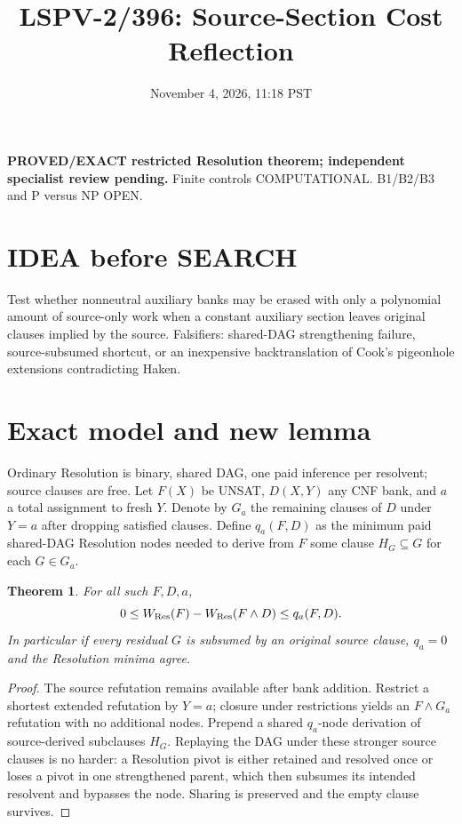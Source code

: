 \documentclass{article}
\title{LSPV-2/396: Source-Section Cost Reflection}
\date{November 4, 2026, 11:18 PST}
\newtheorem{theorem}{Theorem}
\begin{document}
\maketitle
\noindent\textbf{PROVED/EXACT restricted Resolution theorem; independent specialist review pending.} Finite controls COMPUTATIONAL. B1/B2/B3 and P versus NP OPEN.
\section*{IDEA before SEARCH}
Test whether nonneutral auxiliary banks may be erased with only a polynomial amount of source-only work when a constant auxiliary section leaves original clauses implied by the source. Falsifiers: shared-DAG strengthening failure, source-subsumed shortcut, or an inexpensive backtranslation of Cook's pigeonhole extensions contradicting Haken.
\section*{Exact model and new lemma}
Ordinary Resolution is binary, shared DAG, one paid inference per resolvent; source clauses are free. Let $F(X)$ be UNSAT, $D(X,Y)$ any CNF bank, and $a$ a total assignment to fresh $Y$. Denote by $G_a$ the remaining clauses of $D$ under $Y=a$ after dropping satisfied clauses. Define $q_a(F,D)$ as the minimum paid shared-DAG Resolution nodes needed to derive from $F$ some clause $H_G\subseteq G$ for each $G\in G_a$.
\begin{theorem}
For all such $F,D,a$,
\[
0\le W_{\rm Res}(F)-W_{\rm Res}(F\land D)\le q_a(F,D).
\]
In particular if every residual $G$ is subsumed by an original source clause, $q_a=0$ and the Resolution minima agree.
\end{theorem}
\begin{proof}
The source refutation remains available after bank addition. Restrict a shortest extended refutation by $Y=a$; closure under restrictions yields an $F\land G_a$ refutation with no additional nodes. Prepend a shared $q_a$-node derivation of source-derived subclauses $H_G$. Replaying the DAG under these stronger source clauses is no harder: a Resolution pivot is either retained and resolved once or loses a pivot in one strengthened parent, which then subsumes its intended resolvent and bypasses the node. Sharing is preserved and the empty clause survives.
\end{proof}
\end{document}
